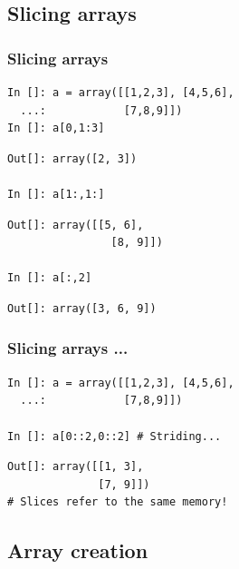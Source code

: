 \documentclass[14pt,compress]{beamer}
\begin{document}
\subsection{Slicing arrays}

\begin{frame}
  \frametitle{Slicing arrays}
  \vspace*{-0.2in}
\begin{lstlisting}
In []: a = array([[1,2,3], [4,5,6],
  ...:            [7,8,9]])
In []: a[0,1:3]
\end{lstlisting}
  \pause
  \vspace*{-0.1in}
\begin{lstlisting}
Out[]: array([2, 3])

In []: a[1:,1:]
\end{lstlisting}
  \pause
  \vspace*{-0.1in}
\begin{lstlisting}
Out[]: array([[5, 6],
                [8, 9]])

In []: a[:,2]
\end{lstlisting}
  \pause
  \vspace*{-0.1in}
\begin{lstlisting}
Out[]: array([3, 6, 9])
\end{lstlisting}
\end{frame}

\begin{frame}
  \frametitle{Slicing arrays ...}
  \vspace*{-0.2in}
\begin{lstlisting}
In []: a = array([[1,2,3], [4,5,6],
  ...:            [7,8,9]])

In []: a[0::2,0::2] # Striding...
\end{lstlisting}
  \pause
  \vspace*{-0.1in}
\begin{lstlisting}
Out[]: array([[1, 3],
              [7, 9]])
# Slices refer to the same memory!
\end{lstlisting}
\end{frame}

\subsection{Array creation}
\end{document}
